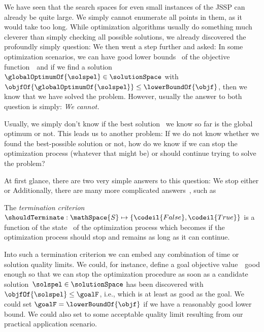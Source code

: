 %
\label{sec:terminationCriterion}%
%
We have seen that the search spaces for even small instances of the \gls{JSSP} can already be quite large.
We simply cannot enumerate all points in them, as it would take too long.
While optimization algorithms usually do something much cleverer than simply checking all possible solutions, we already discovered the profoundly simply question:
We then went a step further and asked:
In some optimization scenarios, we can have good lower bounds~\lowerBoundOf{\objf} of the objective function~\objf\ and if we find a solution~$\globalOptimumOf{\solspel}\in\solutionSpace$ with $\objfOf{\globalOptimumOf{\solspel}}\leq\lowerBoundOf{\objf}$, then we know that we have solved the problem.
However, usually the answer to both question is simply:
\emph{We cannot.}

Usually, we simply don't know if the best solution~\bestSoFarOf{\solspel} we know so far is the global optimum or not.
This leads us to another problem:
If we do not know whether we found the best-possible solution or not, how do we know if we can stop the optimization process (whatever that might be) or should continue trying to solve the problem?

At first glance, there are two very simple answers to this question:
We stop either  or 
Additionally, there are many more complicated answers~\cite{GCJ2017TCIEAAS}, such as %
%
%
\label{sec:termination:defs}%
%
\begin{definition}%
\label{def:terminationCriterion}%
The \emph{termination criterion}~$\shouldTerminate:\mathSpace{S}\mapsto\{\codeil{False}, \codeil{True}\}$ is a function of the state~ of the optimization process which becomes  if the optimization process should stop and remains  as long as it can continue.%
\end{definition}%
%
Into such a termination criterion we can embed any combination of time or solution quality limits.
We could, for instance, define a goal objective value~\goalF\ good enough so that we can stop the optimization procedure as soon as a candidate solution~$\solspel\in\solutionSpace$ has been discovered with $\objfOf{\solspel}\leq\goalF$, i.e., which is at least as good as the goal.
We could set $\goalF=\lowerBoundOf{\objf}$ if we have a reasonably good lower bound.
We could also set to some acceptable quality limit resulting from our practical application scenario.

